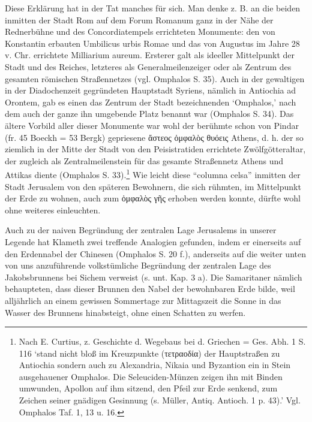 \documentclass[a4paper, 11pt, oneside]{article}
\begin{document}
Diese Erklärung hat in der Tat manches für sich. Man denke z. B. an die beiden inmitten der Stadt Rom auf dem Forum Romanum ganz in der Nähe der Rednerbühne und des Concordiatempels errichteten Monumente: den von Konstantin erbauten Umbilicus urbis Romae und das von Augustus im Jahre 28 v. Chr. errichtete Milliarium aureum. Ersterer galt als ideeller Mittelpunkt der Stadt und des Reiches, letzteres als Generalmeilenzeiger oder als Zentrum des gesamten römischen Straßennetzes (vgl. Omphalos S. 35). Auch in der gewaltigen in der Diadochenzeit gegründeten Hauptstadt Syriens, nämlich in Antiochia ad Orontem, gab es einen das Zentrum der Stadt bezeichnenden `Omphalos,' nach dem auch der ganze ihn umgebende Platz benannt war (Omphalos S. 34). Das ältere Vorbild aller dieser Monumente war wohl der berühmte schon von Pindar (fr. 45 Boeckh = 53 Bergk) gepriesene ἄστεος ὀμφαλὸς θυόεις Athens, d. h. der so ziemlich in der Mitte der Stadt von den Peisistratiden errichtete Zwölfgötteraltar, der zugleich als Zentralmeilenstein für das gesamte Straßennetz Athens und Attikas diente (Omphalos S. 33).\footnote{Nach E. Curtius, z. Geschichte d. Wegebaus bei d. Griechen = Ges. Abh. 1 S. 116 `stand nicht bloß im Kreuzpunkte (τετραοδία) der Hauptstraßen zu Antiochia sondern auch zu Alexandria, Nikaia und Byzantion ein in Stein ausgehauener Omphalos. Die Seleuciden-Münzen zeigen ihn mit Binden umwunden, Apollon auf ihm sitzend, den Pfeil zur Erde senkend, zum Zeichen seiner gnädigen Gesinnung (s. Müller, Antiq. Antioch. 1 p. 43).' Vgl. Omphalos Taf. 1, 13 u. 16.} Wie leicht diese "`columna celsa"' inmitten der Stadt Jerusalem von den späteren Bewohnern, die sich rühmten, im Mittelpunkt der Erde zu wohnen, auch zum ὀμφαλὸς γῆς erhoben werden konnte, dürfte wohl ohne weiteres einleuchten.

Auch zu der naiven Begründung der zentralen Lage Jerusalems in unserer Legende hat Klameth zwei treffende Analogien gefunden, indem er einerseits auf den Erdennabel der Chinesen (Omphalos S. 20 f.), anderseits auf die weiter unten von uns anzuführende volkstümliche Begründung der zentralen Lage des Jakobsbrunnens bei Sichem verweist (s. unt. Kap. 3 a). Die Samaritaner nämlich behaupteten, dass dieser Brunnen den Nabel der bewohnbaren Erde bilde, weil alljährlich an einem gewissen Sommertage zur Mittagszeit die Sonne in das Wasser des Brunnens hinabsteigt, ohne einen Schatten zu werfen.
\end{document}
